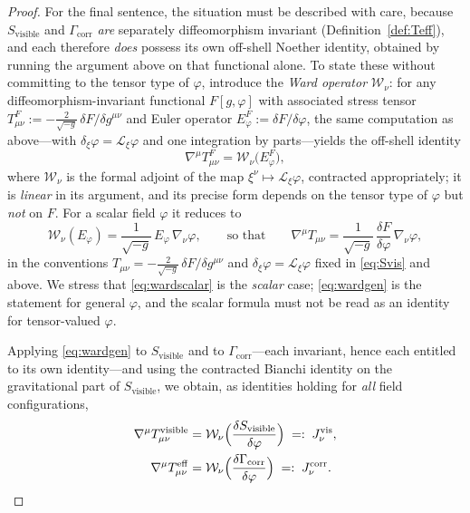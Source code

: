\documentclass[11pt,reqno]{amsart}
\numberwithin{equation}{section}
\theoremstyle{plain}
\theoremstyle{definition}
\theoremstyle{remark}
\newcommand{\Gcorr}{\Gamma_{\mathrm{corr}}}
\newcommand{\Svis}{S_{\mathrm{visible}}}
\begin{document}
\begin{proof}
For the final sentence, the situation must be described with care, because $\Svis$ and $\Gcorr$
\emph{are} separately diffeomorphism invariant (Definition~\ref{def:Teff}), and each therefore
\emph{does} possess its own off-shell Noether identity, obtained by running the argument above
on that functional alone. To state these without committing to the tensor type of $\varphi$,
introduce the \emph{Ward operator} $\mathcal{W}_{\nu}$: for any diffeomorphism-invariant
functional $F[g,\varphi]$ with associated stress tensor
$T^{F}_{\mu\nu}:=-\tfrac{2}{\sqrt{-g}}\,\delta F/\delta g^{\mu\nu}$ and Euler operator
$E^{F}_{\varphi}:=\delta F/\delta\varphi$, the same computation as above---with
$\delta_{\xi}\varphi=\mathcal{L}_{\xi}\varphi$ and one integration by parts---yields the
off-shell identity
\begin{equation}
\label{eq:wardgen}
\nabla^{\mu}T^{F}_{\mu\nu}=\mathcal{W}_{\nu}\bigl(E^{F}_{\varphi}\bigr),
\end{equation}
where $\mathcal{W}_{\nu}$ is the formal adjoint of the map
$\xi^{\nu}\mapsto\mathcal{L}_{\xi}\varphi$, contracted appropriately; it is \emph{linear} in
its argument, and its precise form depends on the tensor type of $\varphi$ but \emph{not} on
$F$. For a scalar field $\varphi$ it reduces to
\begin{equation}
\label{eq:wardscalar}
\mathcal{W}_{\nu}(E_{\varphi})
=\frac{1}{\sqrt{-g}}\,E_{\varphi}\,\nabla_{\nu}\varphi ,
\qquad\text{so that}\qquad
\nabla^{\mu}T_{\mu\nu}
=\frac{1}{\sqrt{-g}}\,\frac{\delta F}{\delta\varphi}\,\nabla_{\nu}\varphi ,
\end{equation}
in the conventions $T_{\mu\nu}=-\tfrac{2}{\sqrt{-g}}\,\delta F/\delta g^{\mu\nu}$ and
$\delta_{\xi}\varphi=\mathcal{L}_{\xi}\varphi$ fixed in \eqref{eq:Svis} and above. We stress
that \eqref{eq:wardscalar} is the \emph{scalar} case; \eqref{eq:wardgen} is the statement for
general $\varphi$, and the scalar formula must not be read as an identity for tensor-valued
$\varphi$.

Applying \eqref{eq:wardgen} to $\Svis$ and to $\Gcorr$---each invariant, hence each entitled to
its own identity---and using the contracted Bianchi identity on the gravitational part of
$\Svis$, we obtain, as identities holding for \emph{all} field configurations,
\begin{align}
\nabla^{\mu}T^{\mathrm{visible}}_{\mu\nu}
&=\mathcal{W}_{\nu}\Bigl(\frac{\delta\Svis}{\delta\varphi}\Bigr)
\;=:\;J^{\mathrm{vis}}_{\nu},
\label{eq:wardvis}\\
\nabla^{\mu}T^{\mathrm{eff}}_{\mu\nu}
&=\mathcal{W}_{\nu}\Bigl(\frac{\delta\Gcorr}{\delta\varphi}\Bigr)
\;=:\;J^{\mathrm{corr}}_{\nu} .
\label{eq:wardcorr}
\end{align}


\end{proof}
\end{document}
